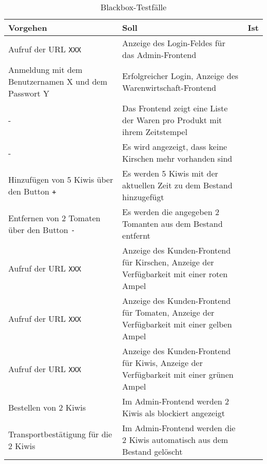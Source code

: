 \begin{table}[H]
\begin{small}
	\begin{center}
  	\caption{Blackbox-Testfälle}
   	\renewcommand{\arraystretch}{1.0}
    \begin{tabularx}{\textwidth}{|X|X|L{1cm}|}		
    
    \hline
    			
    \textbf{Vorgehen} & \textbf{Soll} & \textbf{Ist} \\ \hline
    
    Aufruf der URL \texttt{XXX} & 
    Anzeige des Login-Feldes für das Admin-Frontend &
     \\ \hline
    
    Anmeldung mit dem Benutzernamen X und dem Passwort Y & 
    Erfolgreicher Login, Anzeige des Warenwirtschaft-Frontend &
     \\ \hline
    
    - & 
    Das Frontend zeigt eine Liste der Waren pro Produkt mit ihrem Zeitstempel &
     \\ \hline
     
     - &
     Es wird angezeigt, dass keine Kirschen mehr vorhanden sind & 
    \\ \hline
    
    Hinzufügen von 5 Kiwis über den Button \texttt{+} &
    Es werden 5 Kiwis mit der aktuellen Zeit zu dem Bestand hinzugefügt &
    \\ \hline
    
    Entfernen von 2 Tomaten über den Button \texttt{-} &
    Es werden die angegeben 2 Tomanten aus dem Bestand entfernt & 
    \\ \hline
    
    Aufruf der URL \texttt{XXX} &
    Anzeige des Kunden-Frontend für Kirschen,
    Anzeige der Verfügbarkeit mit einer roten Ampel &
    \\ \hline
    
    Aufruf der URL \texttt{XXX} &
    Anzeige des Kunden-Frontend für Tomaten,
    Anzeige der Verfügbarkeit mit einer gelben Ampel &
	\\ \hline
    
    Aufruf der URL \texttt{XXX} &
    Anzeige des Kunden-Frontend für Kiwis,
    Anzeige der Verfügbarkeit mit einer grünen Ampel &
	\\ \hline
	
	Bestellen von 2 Kiwis &
	Im Admin-Frontend werden 2 Kiwis als blockiert angezeigt &
	\\ \hline
	
	Transportbestätigung für die 2 Kiwis &
	Im Admin-Frontend werden die 2 Kiwis automatisch aus dem Bestand gelöscht & 
	\\ \hline
	
	\end{tabularx}
	\label{tabl:Backbox-Testfaelle}
	\end{center}
\end{small}
\end{table}

 